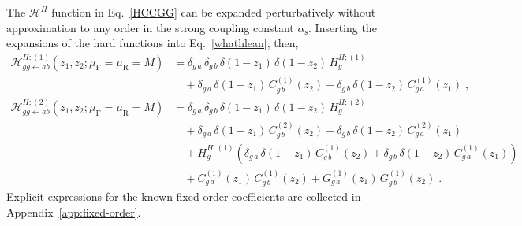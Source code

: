 \documentclass[12pt]{article}
\DeclareRobustCommand{\nn}{\nonumber}
\DeclareRobustCommand{\alphas}{\ensuremath{\alpha_{\mathrm{s}}}\xspace}
\DeclareRobustCommand{\as}{\alphas}
\DeclareRobustCommand{\mur}{\ensuremath{\mu_{\mathrm{R}}}\xspace}
\DeclareRobustCommand{\muf}{\ensuremath{\mu_{\mathrm{F}}}\xspace}
\DeclareRobustCommand{\cH}{\ensuremath{\mathcal{H}}}
\begin{document}
The $\cH^H$ function in Eq.~\eqref{HCCGG} can be expanded perturbatively without approximation to any order in the strong coupling constant $\as$. 
Inserting the expansions of the hard functions into Eq.~\eqref{whathlean}, then,
\begin{align}
  \cH^{H;(1)}_{gg\gets ab}(z_1,z_2; \muf=\mur=M)
  &=
  \delta_{g\,a} \,\delta_{g\,b} 
  \,\delta(1-z_1) \,\delta(1-z_2) 
  \,H^{H;(1)}_g 
  \nn\\&\quad
  +\delta_{g\,a} \,\delta(1-z_1) \,C^{(1)}_{g\,b}(z_2)
  +\delta_{g\,b} \,\delta(1-z_2) \,C^{(1)}_{g\,a}(z_1) \; , 
  \label{H1}
  \\
  \cH^{H;(2)}_{gg\gets ab}(z_1,z_2; \muf=\mur=M)
  &=
  \delta_{g\,a} \,\delta_{g\,b}
  \,\delta(1-z_1) \,\delta(1-z_2) 
  \,H^{H;(2)}_g
  \nn\\&\quad
  +\delta_{g\,a} \,\delta(1-z_1) \,C^{(2)}_{g\,b}(z_2)
  +\delta_{g\,b} \,\delta(1-z_2) \,C^{(2)}_{g\,a}(z_1)
  \nn\\&\quad
  +H^{H;(1)}_g\left(
  \delta_{g\,a} \,\delta(1-z_1) \,C^{(1)}_{g\,b}(z_2) +
  \delta_{g\,b} \,\delta(1-z_2) \,C^{(1)}_{g\,a}(z_1)
  \right)
  \nn\\&\quad
  +C^{(1)}_{g\,a}(z_1) \, C^{(1)}_{g\,b}(z_2)
  +G^{(1)}_{g\,a}(z_1) \, G^{(1)}_{g\,b}(z_2) \; .
  \label{H2}
\end{align}
Explicit expressions for the known fixed-order coefficients are collected in Appendix~\ref{app:fixed-order}. 
\end{document}
